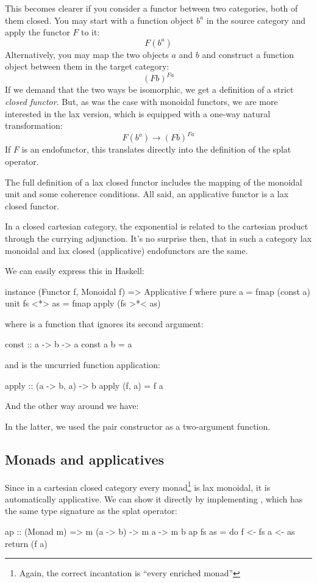 \documentclass[DaoFP]{subfiles}
\begin{document}
This becomes clearer if you consider a functor between two categories, both of them closed. You may start with a function object $b^a$ in the source category and apply the functor $F$ to it:
\[ F (b^a) \]
Alternatively, you may map the two objects $a$ and $b$ and construct a function object between them in the target category:
\[ (F b)^{F a} \]
If we demand that the two ways be isomorphic, we get a definition of a strict \emph{closed functor}. But, as was the case with monoidal functors, we are more interested in the lax version, which is equipped with a one-way natural transformation:
\[ F (b^a) \to (F b)^{F a} \]
If $F$ is an endofunctor, this translates directly into the definition of the splat operator.

The full definition of a lax closed functor includes the mapping of the monoidal unit and some coherence conditions. All said, an applicative functor is a lax closed functor.

In a closed cartesian category, the exponential is related to the cartesian product through the currying adjunction. It's no surprise then, that in such a category lax monoidal and lax closed (applicative) endofunctors are the same.

We can easily express this in Haskell:
\begin{haskell}
instance (Functor f, Monoidal f) => Applicative f where
  pure a = fmap (const a) unit
  fs <*> as = fmap apply (fs >*< as)
\end{haskell}
where  is a function that ignores its second argument:
\begin{haskell}
const :: a -> b -> a
const a b = a
\end{haskell}
and  is the uncurried function application:
\begin{haskell}
apply :: (a -> b, a) -> b
apply (f, a) = f a
\end{haskell}
And the other way around we have:
In the latter, we used the pair constructor \hask{(,)} as a two-argument function.

\subsection{Monads and applicatives}

Since in a cartesian closed category every monad\footnote{Again, the correct incantation is ``every enriched monad''} is lax monoidal, it is automatically applicative. We can show it directly by implementing , which has the same type signature as the splat operator:
\begin{haskell}
ap :: (Monad m) => m (a -> b) -> m a -> m b
ap fs as = do
    f <- fs
    a <- as
    return (f a)
\end{haskell}
\end{document}
